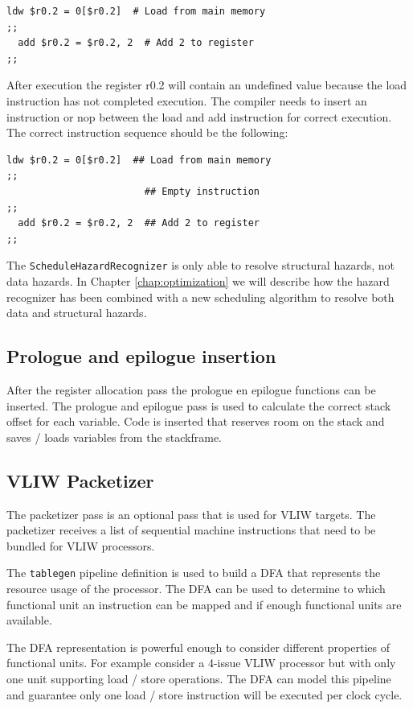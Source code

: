 \begin{lstlisting}[language=rvex]
  ldw $r0.2 = 0[$r0.2]  # Load from main memory
;;
  add $r0.2 = $r0.2, 2  # Add 2 to register
;;
\end{lstlisting}

After execution the register r0.2 will contain an undefined value because the load instruction has not completed execution. The compiler needs to insert an instruction or nop between the load and add instruction for correct execution. The correct instruction sequence should be the following:

\begin{lstlisting}[language=rvex]
  ldw $r0.2 = 0[$r0.2]  ## Load from main memory
;;
                        ## Empty instruction
;;
  add $r0.2 = $r0.2, 2  ## Add 2 to register
;;
\end{lstlisting}

The \texttt{ScheduleHazardRecognizer} is only able to resolve structural hazards, not data hazards. In Chapter \ref{chap:optimization} we will describe how the hazard recognizer has been combined with a new scheduling algorithm to resolve both data and structural hazards.

\subsection{Prologue and epilogue insertion}
After the register allocation pass the prologue en epilogue functions can be inserted. The prologue and epilogue pass is used to calculate the correct stack offset for each variable. Code is inserted that reserves room on the stack and saves / loads variables from the stackframe.

\subsection{VLIW Packetizer}
The packetizer pass is an optional pass that is used for VLIW targets. The packetizer receives a list of sequential machine instructions that need to be bundled for VLIW processors. 

The \texttt{tablegen} pipeline definition is used to build a DFA that represents the resource usage of the processor. The DFA can be used to determine to which functional unit an instruction can be mapped and if enough functional units are available.

The DFA representation is powerful enough to consider different properties of functional units. For example consider a 4-issue VLIW processor but with only one unit supporting load / store operations. The DFA can model this pipeline and guarantee only one load / store instruction will be executed per clock cycle.


